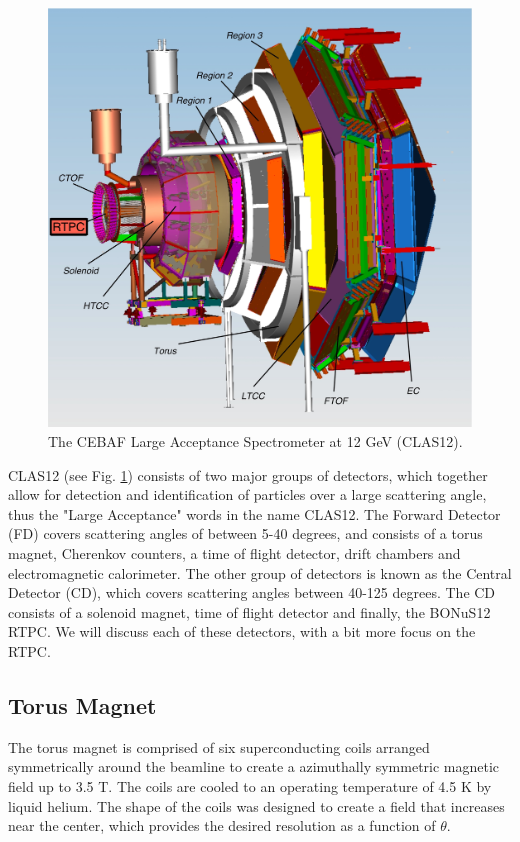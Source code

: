 \begin{figure}[h!]
	\centering
	\includegraphics[width=0.8\linewidth]{figures/clas12.png}
	\caption{The CEBAF Large Acceptance Spectrometer at 12 GeV (CLAS12).}
	\label{fig:clas12}
\end{figure}

CLAS12 (see Fig. \ref{fig:clas12}) consists of two major groups of detectors, which together allow for detection and identification of particles over a large scattering angle, thus the "Large Acceptance" words in the name CLAS12. The Forward Detector (FD) covers scattering angles of between 5-40 degrees, and consists of a torus magnet, Cherenkov counters, a time of flight detector, drift chambers and electromagnetic calorimeter. The other group of detectors is known as the Central Detector (CD), which covers scattering angles between 40-125 degrees. The CD consists of a solenoid magnet, time of flight detector and finally, the BONuS12 RTPC. We will discuss each of these detectors, with a bit more focus on the RTPC.

\subsection{Torus Magnet}
The torus magnet is comprised of six superconducting coils arranged symmetrically around the beamline to create a azimuthally symmetric magnetic field up to 3.5 T. The coils are cooled to an operating temperature of 4.5 K by liquid helium. The shape of the coils was designed to create a field that increases near the center, which provides the desired resolution as a function of $\theta$.

